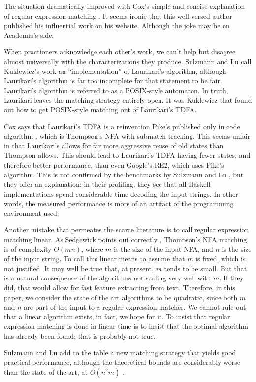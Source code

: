 \documentclass[english]{sigplanconf}
\theoremstyle{definition}
\newcommand{\ra}{$\rightarrow$}
\newcommand{\del}[1]{\textcolor{red}{\sout{#1}}} %
\newcommand{\chg}[2]{\textcolor{red}{\sout{#1}}{\ra}\textcolor{blue}{\uline{#2}}} %
\newcommand{\del}[1]{} %
\newcommand{\chg}[2]{#2}
\renewcommand{\del}[1]{} %
\renewcommand{\chg}[2]{#2} %
\begin{document}
The situation dramatically improved with Cox's simple and concise
explanation of regular expression matching \cite{Cox07a}. It seems
ironic that this well-versed author published his influential work
on his website. Although the joke may be on Academia's side.

When \del{the taciturn} practioners acknowledge each other's work, we can't
help but disagree almost universally with the characterizations they
produce. Sulzmann and Lu \cite{Sulz12a} call Kuklewicz's
work an ``implementation'' of Laurikari's algorithm, although Laurikari's
algorithm is far too incomplete for that statement to be fair. Laurikari's
algorithm is referred to as a POSIX-style automaton. In truth, Laurikari
leaves the matching strategy entirely open. It was Kuklewicz that
found out how to get POSIX-style matching out of Laurikari's TDFA. 

Cox says that Laurikari's TDFA is a reinvention Pike's published only
in code algorithm \cite{Pike87a}, which is Thompson's NFA with submatch
tracking. This seems unfair in that Laurikari's allows for far more
aggressive \chg{reusing}{reuse} of old states than \del{what} Thompson allows. This should
lead to Laurikari's TDFA having fewer states, and therefore better
performance, than even Google's RE2, which uses Pike's algorithm.
This is not confirmed by the benchmarks by Sulzmann and Lu \cite{Sulz12a},
but they offer an explanation: in their profiling, they see that all
Haskell implementations spend considerable time decoding the input
strings. In other words, the measured performance is more of an artifact
of the programming environment used. 

Another mistake that permeates the scarce literature is to call regular
expression matching linear. As Sedgewick points out correctly \cite{Sedg90a},
Thompson's NFA matching is of complexity $O(mn)$, where $m$ is the
size of the input NFA, and $n$ is the size of the input string. To
call this linear means to assume that $m$ is fixed, which is not justified. It may well be true that, at present,
$m$ tends to be small. But that is a natural consequence of the algorithms
not scaling very well with $m$. If they did, that would allow for
fast feature extracting from text. Therefore, in this paper, we consider
the state of the art algorithms to be quadratic, since both $m$ and
$n$ are part of the input to a regular expression matcher. We cannot
rule out that a linear algorithm exists, in fact, we hope for it.
To insist that regular expression matching is done in linear time
is to insist that the optimal algorithm has already been found; that
is probably not true.

Sulzmann and Lu add to the table a new matching strategy that yields
good practical performance, although the theoretical bounds are considerably
worse than the state of the art, at $O(n^{2}m)$ \cite{Sulz12a}.



\end{document}
